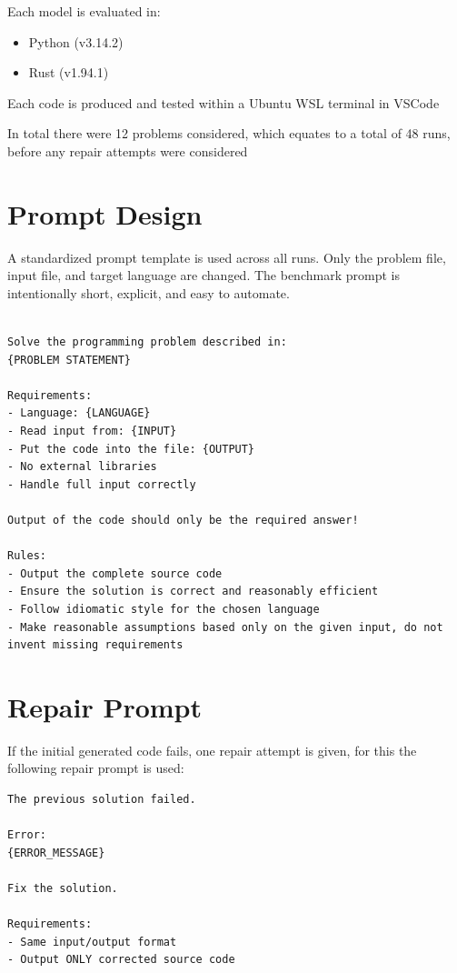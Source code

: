 \documentclass[12pt,a4paper]{report}
\begin{document}
Each model is evaluated in:
\begin{itemize}
    \item Python (v3.14.2)
    \item Rust (v1.94.1)
\end{itemize}

Each code is produced and tested within a Ubuntu WSL terminal in VSCode

In total there were 12 problems considered, which equates to a total of 48 runs, before any repair attempts were considered

\section{Prompt Design}
A standardized prompt template is used across all runs. Only the problem file, input file, and target language are changed. The benchmark prompt is intentionally short, explicit, and easy to automate.

\begin{lstlisting}

Solve the programming problem described in:
{PROBLEM STATEMENT}

Requirements:
- Language: {LANGUAGE}
- Read input from: {INPUT}
- Put the code into the file: {OUTPUT}
- No external libraries
- Handle full input correctly

Output of the code should only be the required answer!

Rules:
- Output the complete source code
- Ensure the solution is correct and reasonably efficient
- Follow idiomatic style for the chosen language
- Make reasonable assumptions based only on the given input, do not invent missing requirements
\end{lstlisting}

\section{Repair Prompt}
If the initial generated code fails, one repair attempt is given, for this the following repair prompt is used:

\begin{lstlisting}
The previous solution failed.

Error:
{ERROR_MESSAGE}

Fix the solution.

Requirements:
- Same input/output format
- Output ONLY corrected source code

\end{lstlisting}
\end{document}
